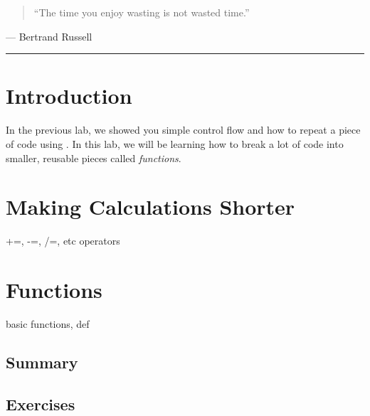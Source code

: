 \documentclass[11pt]{cselabheader}
\begin{document}

\begin{quotation}
``The time you enjoy wasting is not wasted time.''
\end{quotation}
\begin{flushright}
  --- Bertrand Russell
\end{flushright}

\hrule

\tableofcontents

\pagebreak
{}

\section{Introduction}
\label{sec:intro}

In the previous lab, we showed you simple control flow and how to repeat a piece
of code using . In this lab, we will be learning how to
break a lot of code into smaller, reusable pieces called \emph{functions}.

\section{Making Calculations Shorter}
\label{sec:calc}

+=, -=, /=, etc operators

\pagebreak
\section{Functions}
\label{sec:funcs}

basic functions, def

\subsection{Summary}
\label{subsec:funcs.sum}

\subsection{Exercises}
\label{subsec:funcs.ex}
\end{document}
